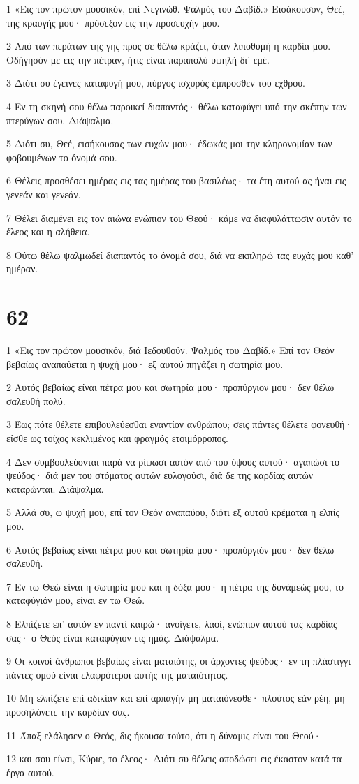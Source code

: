 \par 1 «Εις τον πρώτον μουσικόν, επί Νεγινώθ. Ψαλμός του Δαβίδ.» Εισάκουσον, Θεέ, της κραυγής μου· πρόσεξον εις την προσευχήν μου.
\par 2 Από των περάτων της γης προς σε θέλω κράζει, όταν λιποθυμή η καρδία μου. Οδήγησόν με εις την πέτραν, ήτις είναι παραπολύ υψηλή δι' εμέ.
\par 3 Διότι συ έγεινες καταφυγή μου, πύργος ισχυρός έμπροσθεν του εχθρού.
\par 4 Εν τη σκηνή σου θέλω παροικεί διαπαντός· θέλω καταφύγει υπό την σκέπην των πτερύγων σου. Διάψαλμα.
\par 5 Διότι συ, Θεέ, εισήκουσας των ευχών μου· έδωκάς μοι την κληρονομίαν των φοβουμένων το όνομά σου.
\par 6 Θέλεις προσθέσει ημέρας εις τας ημέρας του βασιλέως· τα έτη αυτού ας ήναι εις γενεάν και γενεάν.
\par 7 Θέλει διαμένει εις τον αιώνα ενώπιον του Θεού· κάμε να διαφυλάττωσιν αυτόν το έλεος και η αλήθεια.
\par 8 Ούτω θέλω ψαλμωδεί διαπαντός το όνομά σου, διά να εκπληρώ τας ευχάς μου καθ' ημέραν.

\chapter{62}

\par 1 «Εις τον πρώτον μουσικόν, διά Ιεδουθούν. Ψαλμός του Δαβίδ.» Επί τον Θεόν βεβαίως αναπαύεται η ψυχή μου· εξ αυτού πηγάζει η σωτηρία μου.
\par 2 Αυτός βεβαίως είναι πέτρα μου και σωτηρία μου· προπύργιον μου· δεν θέλω σαλευθή πολύ.
\par 3 Έως πότε θέλετε επιβουλεύεσθαι εναντίον ανθρώπου; σεις πάντες θέλετε φονευθή· είσθε ως τοίχος κεκλιμένος και φραγμός ετοιμόρροπος.
\par 4 Δεν συμβουλεύονται παρά να ρίψωσι αυτόν από του ύψους αυτού· αγαπώσι το ψεύδος· διά μεν του στόματος αυτών ευλογούσι, διά δε της καρδίας αυτών καταρώνται. Διάψαλμα.
\par 5 Αλλά συ, ω ψυχή μου, επί τον Θεόν αναπαύου, διότι εξ αυτού κρέμαται η ελπίς μου.
\par 6 Αυτός βεβαίως είναι πέτρα μου και σωτηρία μου· προπύργιόν μου· δεν θέλω σαλευθή.
\par 7 Εν τω Θεώ είναι η σωτηρία μου και η δόξα μου· η πέτρα της δυνάμεώς μου, το καταφύγιόν μου, είναι εν τω Θεώ.
\par 8 Ελπίζετε επ' αυτόν εν παντί καιρώ· ανοίγετε, λαοί, ενώπιον αυτού τας καρδίας σας· ο Θεός είναι καταφύγιον εις ημάς. Διάψαλμα.
\par 9 Οι κοινοί άνθρωποι βεβαίως είναι ματαιότης, οι άρχοντες ψεύδος· εν τη πλάστιγγι πάντες ομού είναι ελαφρότεροι αυτής της ματαιότητος.
\par 10 Μη ελπίζετε επί αδικίαν και επί αρπαγήν μη ματαιόνεσθε· πλούτος εάν ρέη, μη προσηλόνετε την καρδίαν σας.
\par 11 Άπαξ ελάλησεν ο Θεός, δις ήκουσα τούτο, ότι η δύναμις είναι του Θεού·
\par 12 και σου είναι, Κύριε, το έλεος· Διότι συ θέλεις αποδώσει εις έκαστον κατά τα έργα αυτού.

